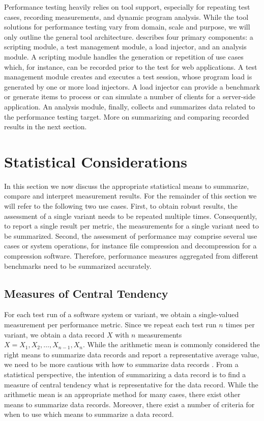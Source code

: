 Performance testing heavily relies on tool support, especially for repeating
test cases, recording measurements, and dynamic program analysis. While the
tool solutions for performance testing vary from domain, scale and purpose, we
will only outline the general tool architecture. \cite{molyneaux_art_2014} describes
four primary components: a scripting module, a test management module, a load
injector, and an analysis module. A scripting module handles the generation or
repetition of use cases which, for instance, can be recorded prior to the test
for web applications. A test management module creates and executes a test
session, whose program load is generated by one or more load injectors. A load
injector can provide a benchmark or generate items to process or can simulate a
number of clients for a server-side application. An analysis module, finally,
collects and summarizes data related to the performance testing target. More on
summarizing and comparing recorded results in the next section.

\section{Statistical Considerations}
In this section we now discuss the appropriate statistical means to summarize,
compare and interpret measurement results. For the remainder of this section we
will refer to the following two use cases. First, to obtain robust results, the
assessment of  a single variant needs to be repeated multiple times.
Consequently, to report a single result per metric, the measurements for a
single variant need to be summarized. Second, the assessment of performance may
comprise several use cases or system operations, for instance file compression
and decompression for a compression software. Therefore, performance measures
aggregated from different benchmarks need to be summarized accurately. 

\subsection{Measures of Central Tendency}
For each test run of a software system or variant, we obtain a single-valued
measurement per performance metric. Since we repeat each test run $n$ times
per variant, we obtain a data record $X$ with $n$ measurements $X = X_1, X_2,
\ldots, X_{n-1}, X_n$. While the arithmetic mean is commonly considered the
right means to summarize data records and report a representative average
value, we need to be more cautious with how to summarize data records
\citep{fleming_how_1986,smith_characterizing_1988}. From a statistical
perspective, the intention of summarizing a data record is to find a measure of
central tendency what is representative for the data record.
While the arithmetic mean is an appropriate method for many cases, there exist
other means to summarize data records. Moreover, there exist a number of
criteria for when to use which means to summarize a data record. 

